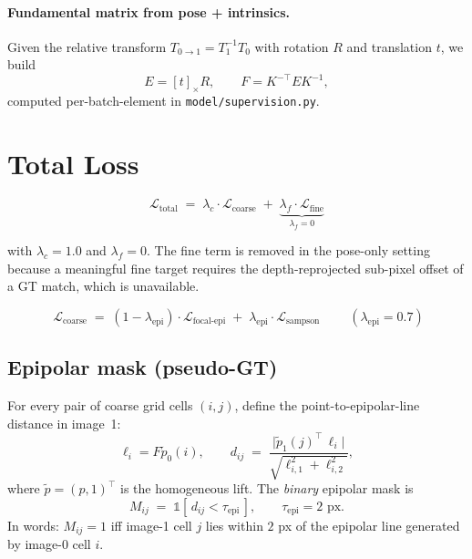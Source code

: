 \documentclass[11pt]{article}
\begin{document}
\paragraph{Fundamental matrix from pose + intrinsics.}
Given the relative transform $T_{0\to 1} = T_1^{-1} T_0$ with rotation
$R$ and translation $t$, we build
\begin{equation}
E = [t]_\times R, \qquad F = K^{-\top} E K^{-1},
\label{eq:F}
\end{equation}
computed per-batch-element in \texttt{model/supervision.py}.

\section{Total Loss}

\begin{equation}
\mathcal{L}_{\text{total}}
\;=\;
\lambda_c \cdot \mathcal{L}_{\text{coarse}}
\;+\; \underbrace{\lambda_f \cdot \mathcal{L}_{\text{fine}}}_{\lambda_f = 0}
\end{equation}

with $\lambda_c = 1.0$ and $\lambda_f = 0$. The fine term is removed in
the pose-only setting because a meaningful fine target requires the
depth-reprojected sub-pixel offset of a GT match, which is unavailable.

\begin{equation}
\boxed{\;
\mathcal{L}_{\text{coarse}}
\;=\;
(1 - \lambda_{\text{epi}}) \cdot \mathcal{L}_{\text{focal-epi}}
\;+\;
\lambda_{\text{epi}} \cdot \mathcal{L}_{\text{sampson}}
\;}
\qquad (\lambda_{\text{epi}} = 0.7)
\end{equation}

\subsection{Epipolar mask (pseudo-GT)}

For every pair of coarse grid cells $(i, j)$, define the
point-to-epipolar-line distance in image~1:
\begin{equation}
\ell_i = F \tilde p_0(i),\qquad
d_{ij} \;=\; \frac{\bigl|\tilde p_1(j)^{\top}\,\ell_i\bigr|}{\sqrt{\ell_{i,1}^2 + \ell_{i,2}^2}},
\end{equation}
where $\tilde p = (p, 1)^\top$ is the homogeneous lift. The
\emph{binary} epipolar mask is
\begin{equation}
M_{ij} \;=\; \mathbb{1}\!\left[\, d_{ij} < \tau_{\text{epi}} \,\right],
\qquad \tau_{\text{epi}} = 2 \text{ px}.
\end{equation}
In words: $M_{ij} = 1$ iff image-1 cell $j$ lies within $2$ px of the
epipolar line generated by image-0 cell $i$.
\end{document}
